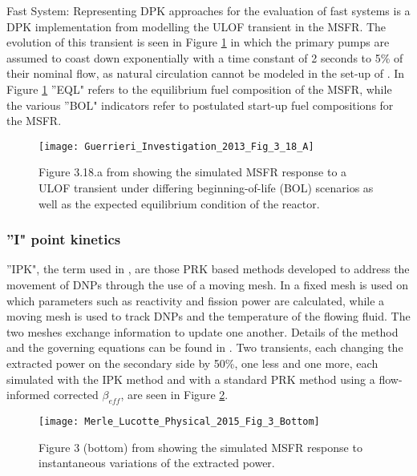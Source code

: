 \documentclass[review]{elsarticle}
\begin{document}
\par Fast System: Representing DPK approaches for the evaluation of fast
systems is a DPK implementation from \cite{guerrieri_investigation_2013}
modelling the ULOF transient in the MSFR. The evolution of this transient is
seen in Figure \ref{fig:guerrieri_msfr_ulof} in which the primary pumps are
assumed to coast down exponentially with a time constant of 2 seconds to 5\%
 of their nominal flow, as natural circulation cannot be modeled in the set-up
of \cite{guerrieri_investigation_2013}. In Figure 
\ref{fig:guerrieri_msfr_ulof} 
''EQL" refers to the equilibrium fuel composition of the
MSFR, while the various ''BOL" indicators refer to postulated start-up fuel
compositions for the MSFR. 

\begin{figure}[H]
   \centering
   \texttt{[image: Guerrieri\_Investigation\_2013\_Fig\_3\_18\_A]}
   \caption{Figure 3.18.a from \cite{guerrieri_investigation_2013} showing the simulated MSFR
   response to a ULOF transient under differing beginning-of-life (BOL) scenarios as well as the
   expected equilibrium condition of the reactor.} 
   \label{fig:guerrieri_msfr_ulof}
\end{figure}


\subsubsection{''I" point kinetics} \label{sssec:spk}
''IPK", the term used in \cite{merle-lucotte_physical_2015},
are those PRK based methods developed to address the
movement of DNPs through the use of a moving mesh. In
\cite{merle-lucotte_physical_2015} a fixed mesh is used on which parameters
such as reactivity and fission power are calculated, while a moving mesh is
used to track DNPs and the temperature of the flowing fluid. The two
meshes exchange information to update one another. Details of the method and
the governing equations can be found in \cite{merle-lucotte_physical_2015}.
Two transients, each changing the extracted power on the secondary side by
50\%, one less and one more, each simulated with the IPK method and with a
standard PRK method using a flow-informed corrected $\beta_{eff}$, are seen
in Figure \ref{fig:lucotte_ipk}.

\begin{figure}[H]
   \centering
   \texttt{[image: Merle\_Lucotte\_Physical\_2015\_Fig\_3\_Bottom]}
   \caption{Figure 3 (bottom) from \cite{merle-lucotte_physical_2015} showing the simulated MSFR
   response to instantaneous variations of the extracted power.} 
   \label{fig:lucotte_ipk}
\end{figure}
\end{document}
